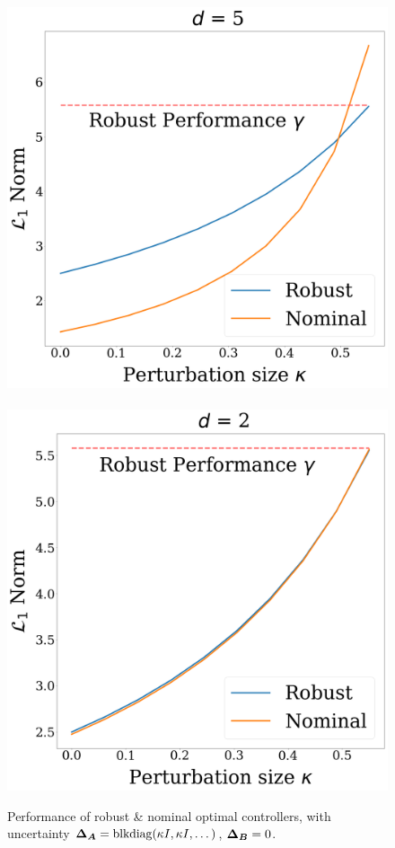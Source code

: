 \begin{figure}
\includegraphics[width=.45\columnwidth]{d5.png}~\includegraphics[width=.45\columnwidth]{d2.png}
\caption{Performance of robust \& nominal optimal controllers, with uncertainty  ${\boldsymbol{\Delta}}_{\boldsymbol{A}} = \mathrm{blkdiag}(\kappa I, \kappa I, \dots)$, ${\boldsymbol{\Delta}}_{\boldsymbol{B}} = 0$. }%
\label{fig:kappa}
\end{figure}

